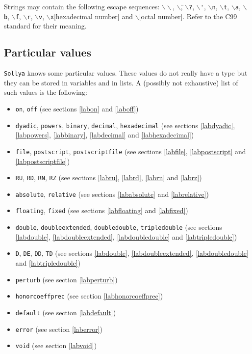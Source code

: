 \documentclass[a4paper]{article}
\newcommand{\com}[1]{\texttt{#1}}
\newcommand{\sollya}{\texttt{Sollya}\xspace}
\begin{document}


Strings may contain the following escape sequences:
\texttt{$\backslash\backslash$}, \texttt{$\backslash$\"},
\texttt{$\backslash$?}, \texttt{$\backslash$\'},
\texttt{$\backslash$n}, \texttt{$\backslash$t},
\texttt{$\backslash$a}, \texttt{$\backslash$b},
\texttt{$\backslash$f}, \texttt{$\backslash$r},
\texttt{$\backslash$v}, \texttt{$\backslash$x}[hexadecimal number] and
\texttt{$\backslash$}[octal number]. Refer to the C99 standard for their
meaning.

\subsection{Particular values}
\sollya knows some particular values. These values do not really have a type but they can be stored in variables and in lists. A (possibly not exhaustive) list of such values is the following:

\begin{itemize}
\item \com{on}, \com{off} (see sections \ref{labon} and \ref{laboff})
\item \com{dyadic}, \com{powers}, \com{binary}, \com{decimal}, \com{hexadecimal} (see sections \ref{labdyadic}, \ref{labpowers}, \ref{labbinary}, \ref{labdecimal} and \ref{labhexadecimal})
\item \com{file}, \com{postscript}, \com{postscriptfile} (see sections \ref{labfile}, \ref{labpostscript} and \ref{labpostscriptfile})
\item \com{RU}, \com{RD}, \com{RN}, \com{RZ} (see sections \ref{labru}, \ref{labrd}, \ref{labrn} and \ref{labrz})
\item \com{absolute}, \com{relative} (see sections \ref{lababsolute} and \ref{labrelative})
\item \com{floating}, \com{fixed} (see sections \ref{labfloating} and \ref{labfixed})
\item \com{double}, \com{doubleextended}, \com{doubledouble}, \com{tripledouble} (see sections \ref{labdouble}, \ref{labdoubleextended}, \ref{labdoubledouble} and \ref{labtripledouble})
\item \com{D}, \com{DE}, \com{DD}, \com{TD} (see sections \ref{labdouble}, \ref{labdoubleextended}, \ref{labdoubledouble} and \ref{labtripledouble})
\item \com{perturb} (see section \ref{labperturb})
\item \com{honorcoeffprec} (see section \ref{labhonorcoeffprec})
\item \com{default} (see section \ref{labdefault})
\item \com{error} (see section \ref{laberror})
\item \com{void} (see section \ref{labvoid})
\end{itemize}
\end{document}
